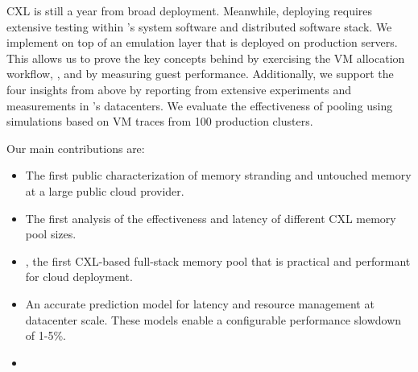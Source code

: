 
CXL is still a year from broad deployment.
Meanwhile, deploying \sys requires extensive testing within \azure's system software and distributed software stack.
We implement \sys on top of an emulation layer that is deployed on production servers.
This allows us to prove the key concepts behind \sys by exercising the VM allocation workflow, \cvn, and by measuring guest performance.
Additionally, we support the four insights from above by reporting from extensive experiments and measurements in \azure's datacenters. We evaluate the effectiveness of pooling using simulations based on VM traces from 100 production clusters.

 Our main contributions are:
\begin{itemize}
\item The first public characterization of memory stranding and untouched memory at a large public cloud provider.
\item The first analysis of the effectiveness and latency of different CXL memory pool sizes.
\item \sys, the first CXL-based full-stack memory pool that is practical and performant for cloud deployment.
\item An accurate prediction model for latency and resource management at datacenter scale. These models enable a configurable performance slowdown of 1-5\%.
\item {}
\end{itemize}


